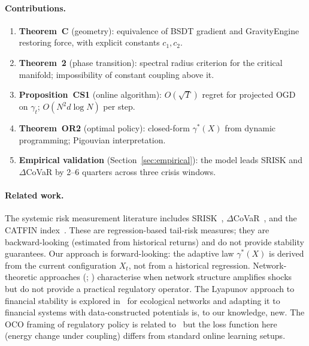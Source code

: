 \documentclass[11pt]{article}
\theoremstyle{definition}
\begin{document}
\paragraph{Contributions.}
\begin{enumerate}
  \item \textbf{Theorem~C} (geometry): equivalence of BSDT gradient and GravityEngine
        restoring force, with explicit constants $c_1, c_2$.
  \item \textbf{Theorem~2} (phase transition): spectral radius criterion for the
        critical manifold; impossibility of constant coupling above it.
  \item \textbf{Proposition~CS1} (online algorithm): $O(\sqrt{T})$ regret for
        projected OGD on $\gamma_t$; $O(N^2 d \log N)$ per step.
  \item \textbf{Theorem~OR2} (optimal policy): closed-form $\gamma^*(X)$ from
        dynamic programming; Pigouvian interpretation.
  \item \textbf{Empirical validation} (Section~\ref{sec:empirical}): the model
        leads SRISK and $\Delta$CoVaR by 2--6 quarters across three crisis windows.
\end{enumerate}

\paragraph{Related work.}
The systemic risk measurement literature includes SRISK~\citep{brownlees2017srisk},
$\Delta$CoVaR~\citep{adrian2016covar}, and the CATFIN index~\citep{allen2012systemic}.
These are regression-based tail-risk measures; they are backward-looking (estimated
from historical returns) and do not provide stability guarantees.  Our approach is
forward-looking: the adaptive law $\gamma^*(X)$ is derived from the current
configuration $X_t$, not from a historical regression.  Network-theoretic approaches
(\citealt{acemoglu2015systemic}; \citealt{elliott2014financial}) characterise when
network structure amplifies shocks but do not provide a practical regulatory
operator.  The Lyapunov approach to financial stability is explored
in~\citealt{may2008complex} for ecological networks and adapting it to financial
systems with data-constructed potentials is, to our knowledge, new.
The OCO framing of regulatory policy is related to~\citealt{shalev2012online}
but the loss function here (energy change under coupling) differs from standard
online learning setups.
\end{document}
